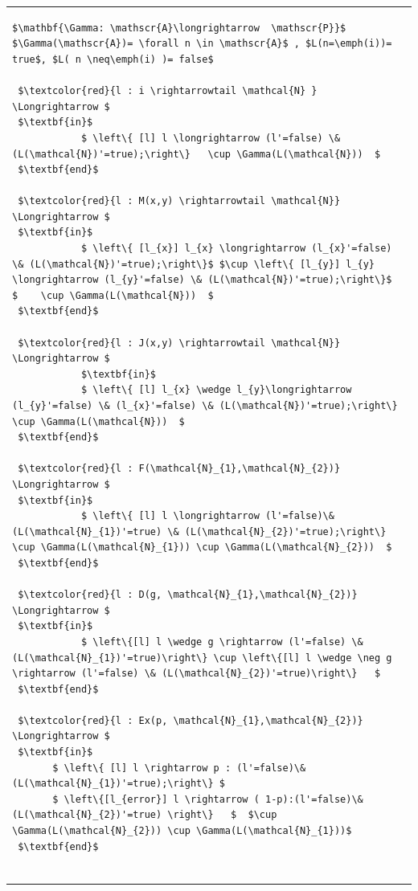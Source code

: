 \documentclass[3p,times,procedia,authoryear,round]{elsarticle}
\begin{document}
\begin{table}
    \begin{center}
        
        \begin{tabular}{ p{15cm} }

			\begin{lstlisting}
$\mathbf{\Gamma: \mathscr{A}\longrightarrow  \mathscr{P}}$ 
$\Gamma(\mathscr{A})= \forall n \in \mathscr{A}$ , $L(n=\emph(i))= true$, $L( n \neq\emph(i) )= false$
			
 $\textcolor{red}{l : i \rightarrowtail \mathcal{N} } \Longrightarrow $
 $\textbf{in}$
			$ \left\{ [l] l \longrightarrow (l'=false) \& (L(\mathcal{N})'=true);\right\}	\cup \Gamma(L(\mathcal{N}))  $	
 $\textbf{end}$
            
 $\textcolor{red}{l : M(x,y) \rightarrowtail \mathcal{N}}  \Longrightarrow $
 $\textbf{in}$
			$ \left\{ [l_{x}] l_{x} \longrightarrow (l_{x}'=false) \& (L(\mathcal{N})'=true);\right\}$ $\cup \left\{ [l_{y}] l_{y} \longrightarrow (l_{y}'=false) \& (L(\mathcal{N})'=true);\right\}$  $	\cup \Gamma(L(\mathcal{N}))  $	
 $\textbf{end}$		
 
 $\textcolor{red}{l : J(x,y) \rightarrowtail \mathcal{N}}  \Longrightarrow $
			$\textbf{in}$
			$ \left\{ [l] l_{x} \wedge l_{y}\longrightarrow (l_{y}'=false) \& (l_{x}'=false) \& (L(\mathcal{N})'=true);\right\} \cup \Gamma(L(\mathcal{N}))  $			
 $\textbf{end}$	
            
 $\textcolor{red}{l : F(\mathcal{N}_{1},\mathcal{N}_{2})}  \Longrightarrow $
 $\textbf{in}$
			$ \left\{ [l] l \longrightarrow (l'=false)\& (L(\mathcal{N}_{1})'=true) \& (L(\mathcal{N}_{2})'=true);\right\}	\cup \Gamma(L(\mathcal{N}_{1})) \cup \Gamma(L(\mathcal{N}_{2}))  $	
 $\textbf{end}$
            
 $\textcolor{red}{l : D(g, \mathcal{N}_{1},\mathcal{N}_{2})}  \Longrightarrow $
 $\textbf{in}$
			$ \left\{[l] l \wedge g \rightarrow (l'=false) \& (L(\mathcal{N}_{1})'=true)\right\} \cup \left\{[l] l \wedge \neg g \rightarrow (l'=false) \& (L(\mathcal{N}_{2})'=true)\right\}   $
 $\textbf{end}$
            
 $\textcolor{red}{l : Ex(p, \mathcal{N}_{1},\mathcal{N}_{2})}  \Longrightarrow $
 $\textbf{in}$
       $ \left\{ [l] l \rightarrow p : (l'=false)\&  (L(\mathcal{N}_{1})'=true);\right\} $        
       $ \left\{[l_{error}] l \rightarrow ( 1-p):(l'=false)\& (L(\mathcal{N}_{2})'=true) \right\}   $  $\cup \Gamma(L(\mathcal{N}_{2})) \cup \Gamma(L(\mathcal{N}_{1}))$
 $\textbf{end}$		
      	

\end{lstlisting}
\end{tabular}
\end{center}
\end{table}
\end{document}
